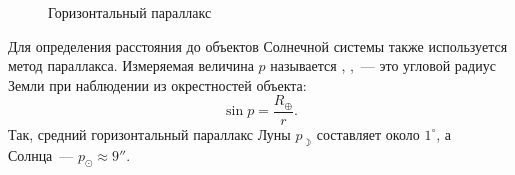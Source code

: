\begin{wrapfigure}[6]{r}{0.45\tw}
    \centering
    \vspace{-1.5pc}
        \caption{Горизонтальный параллакс}
        \label{pic:horizontal-parallax}
\end{wrapfigure}
Для определения расстояния до объектов Солнечной системы также используется метод параллакса. Измеряемая величина $p$ называется , ,~--- это угловой радиус Земли при наблюдении из окрестностей объекта:
\begin{equation}
    \sin p =\frac{R_\oplus}{r}.
\end{equation}
Так, средний горизонтальный параллакс Луны $p_{\rightmoon}$ составляет около $1^\circ$, а Солнца~--- $p_\odot \approx 9''$.
